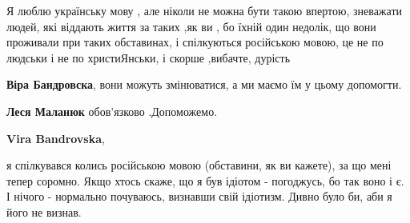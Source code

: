 \begin{itemize}
\begin{itemize}
Я люблю українську мову , але ніколи не можна бути такою впертою, зневажати
людей, які віддають життя за таких ,як ви , бо їхній один недолік, що вони
проживали при таких обставинах, і спілкуються російською мовою, це не по людськи
і не по христиЯнськи, і скорше ,вибачте, дурість

\textbf{Віра Бандровска}, вони можуть змінюватися, а ми маємо їм у цьому допомогти.

\textbf{Леся Маланюк} обов'язково .Допоможемо.

\textbf{Vira Bandrovska}, 

я спілкувався колись російською мовою (обставини, як ви кажете), за що мені
тепер соромно. Якщо хтось скаже, що я був ідіотом - погоджусь, бо так воно і є.
І нічого - нормально почуваюсь, визнавши свій ідіотизм. Дивно було би, аби я
його не визнав.

\end{itemize} %

\end{itemize} %
